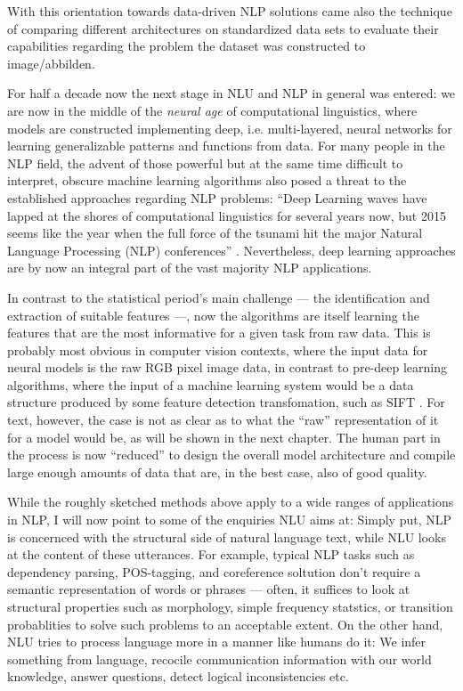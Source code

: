 With this orientation towards data-driven NLP solutions came also the {\color{red} technique}
of comparing different architectures on standardized data sets to evaluate their capabilities
regarding the problem the dataset was constructed to {\color{red} image/abbilden}.

For half a decade now the next stage in NLU and NLP in general was entered: we are now in the
middle of the \emph{neural age} of computational linguistics, where models are constructed
implementing deep, i.e. multi-layered, neural networks for learning generalizable patterns and
functions from data. For many people in the NLP field, the advent of those powerful but at
the same time difficult to interpret, obscure machine learning algorithms also posed a threat to
the established approaches regarding NLP problems: ``Deep Learning waves have lapped at the
shores of computational linguistics for several years now, but 2015 seems like the year when
the full force of the tsunami hit the major Natural Language Processing (NLP) conferences''
\citep[p.~701]{manning2015computational}. Nevertheless, deep learning approaches are by now an integral
part of the vast majority NLP applications.

In contrast to the statistical period's main challenge --- the identification and extraction of
suitable features ---, now the algorithms are itself learning the features that are the most
informative for a given task from raw data. This is probably most obvious in computer vision
contexts, where the input data for neural models is the raw RGB pixel image data, in contrast
to pre-deep learning algorithms, where the input of a machine learning system would be a data
structure produced by some feature detection transfomation, such as SIFT \citep{o2019deep}. For
text, however, the case is not as clear as to what the ``raw'' representation of it for a model
would be, as will be shown in the next chapter. The human part in the process is now ``reduced''
to design the overall model architecture and compile large enough amounts of data that are, in
the best case, also of good quality.

While the roughly sketched methods above apply to a wide ranges of
applications in NLP, I will now point to some of the enquiries NLU aims
at: Simply put, NLP is concernced with the structural side of natural
language text, while NLU looks at the content of these utterances. For
example, typical NLP tasks such as dependency parsing, POS-tagging, and
coreference soltution don't require a semantic representation of words
or phrases --- often, it suffices to look at structural properties such
as morphology, simple frequency statstics, or transition probablities
to solve such problems to an acceptable extent. On the other hand, NLU
tries to process language more in a manner like humans do it: We infer
something from language, recocile communication information with our
world knowledge, answer questions, detect logical inconsistencies etc.

